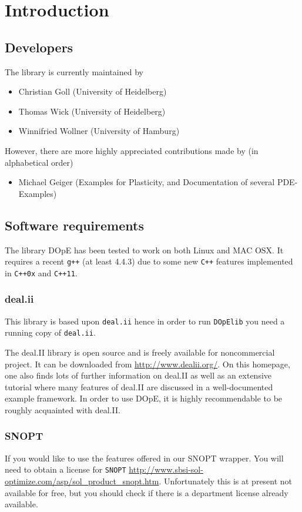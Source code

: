 \chapter{Introduction}\label{chap:intro}
\section{Developers}
The library is currently maintained by 
\begin{itemize}
  \item Christian Goll (University of Heidelberg)
  \item Thomas Wick (University of Heidelberg)
  \item Winnifried Wollner (University of Hamburg)
\end{itemize}

However, there are more highly appreciated contributions
made by (in alphabetical order)
\begin{itemize}
  \item Michael Geiger (Examples for Plasticity, and Documentation of several PDE-Examples)
\end{itemize}

\section{Software requirements}
The library DOpE has been tested to work on both Linux and 
MAC OSX. It requires a recent {\tt g++} (at least 4.4.3) due to 
some new {\tt C++} features implemented in {\tt C++0x} and {\tt C++11}. 

\subsection{deal.ii}
This library is based upon {\tt deal.ii} hence in order to run 
{\tt DOpElib} you need a running copy of {\tt deal.ii}.

The deal.II library is open source and is freely available for noncommercial project.
It can be downloaded from \url{http://www.dealii.org/}. On this
homepage, one also finds lots of further information on deal.II as well as
an extensive tutorial where many features of deal.II are discussed in a
well-documented example framework. In order to use DOpE, it is highly
recommendable to be roughly acquainted with deal.II.

\subsection{SNOPT}
If you would like to use the features offered in our SNOPT wrapper. You will 
need to obtain a license for {\tt SNOPT} 
\url{http://www.sbsi-sol-optimize.com/asp/sol_product_snopt.htm}.
Unfortunately this is at present not available for free, but you should 
check if 
there is a department license already available.

